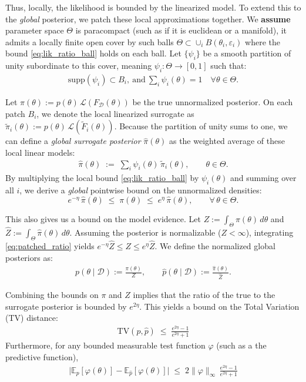 Thus, locally, the likelihood is bounded by the linearized model. To extend this to the \emph{global} posterior, we patch these local approximations together.
We \textbf{assume} parameter space $\Theta$ is paracompact (such as if it is euclidean or a manifold), it admits a locally finite open cover by such balls $\Theta \subset \cup_{i} B(\theta_i, \varepsilon_i)$ where the bound \eqref{eq:lik_ratio_ball} holds on each ball.
Let $\{\psi_i\}$ be a smooth partition of unity subordinate to this cover, meaning $\psi_i:\Theta\to[0,1]$ such that:
\begin{align}
    \mathrm{supp}(\psi_i)\subset B_i, \ \textrm{and} \ \sum_{i} \psi_i(\theta)=1 \quad \forall \theta \in \Theta.
\end{align}

Let $\pi(\theta):=p(\theta)\,\mathcal L(F_{\mathcal D}(\theta))$ be the true unnormalized posterior. On each patch $B_i$,
we denote the local linearized surrogate as $\widetilde\pi_i(\theta):=p(\theta)\,\mathcal L(\widetilde F_i(\theta))$.
Because the partition of unity sums to one, we can define a \emph{global surrogate posterior} $\widehat{\pi}(\theta)$ as the weighted average of these local linear models:
\begin{align}
    \widehat\pi(\theta)\;:=\;\sum_{i} \psi_i(\theta)\,\widetilde\pi_i(\theta),
\qquad \theta\in \Theta.
\end{align}
By multiplying the local bound \eqref{eq:lik_ratio_ball} by $\psi_i(\theta)$ and summing over all $i$, we derive a \emph{global} pointwise bound on the unnormalized densities:
\begin{equation}
\label{eq:patched_ratio}
e^{-\eta}\,\widehat\pi(\theta)\;\le\;\pi(\theta)\;\le\;e^{\eta}\,\widehat\pi(\theta),
\qquad \forall\,\theta\in \Theta.
\end{equation}

This also gives us a bound on the model evidence. Let $Z:=\int_\Theta \pi(\theta)\,d\theta$ and $\widehat Z:=\int_\Theta \widehat\pi(\theta)\,d\theta$. Assuming the posterior is normalizable ($Z < \infty$), integrating \eqref{eq:patched_ratio} yields $e^{-\eta}\widehat Z\le Z\le e^{\eta}\widehat Z$.
We define the normalized global posteriors as:
\begin{align}
    p(\theta\mid\mathcal D):=\frac{\pi(\theta)}{Z},
    \qquad
\widehat p(\theta\mid\mathcal D):=\frac{\widehat\pi(\theta)}{\widehat Z}.
\end{align}

Combining the bounds on $\pi$ and $Z$ implies that the ratio of the true to the surrogate posterior is bounded by $e^{2\eta}$. This yields a bound on the Total Variation (TV) distance:
\begin{align}
    \mathrm{TV}(p,\widehat p)
\;\le\;\frac{e^{2\eta}-1}{e^{2\eta}+1}
\end{align}
Furthermore, for any bounded measurable test function $\varphi$ (such as a the predictive function),
\begin{align}
    \bigl|\mathbb E_{p}[\varphi(\theta)]-\mathbb E_{\widehat p}[\varphi(\theta)]\bigr|
\;\le\;2\|\varphi\|_\infty\,\frac{e^{2\eta}-1}{e^{2\eta}+1}
\end{align}

